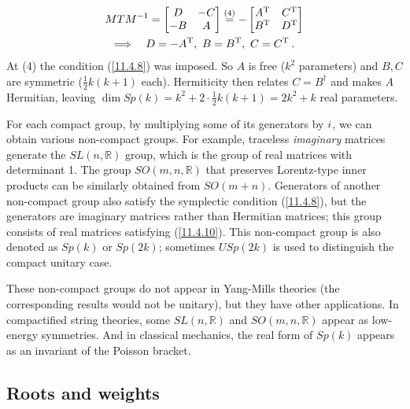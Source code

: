 \begin{itemize}
\begin{tcolorbox}[breakable]
\begin{remark}
\begin{gather*}
				MTM^{-1}=\begin{bmatrix}D&-C\\-B&A\end{bmatrix}\eqs{4}-\begin{bmatrix}A^{\mathrm{T}}&C^{\mathrm{T}}\\B^{\mathrm{T}}&D^{\mathrm{T}}\end{bmatrix}\\
				\Longrightarrow\quad D=-A^{\mathrm{T}},\ B=B^{\mathrm{T}},\ C=C^{\mathrm{T}}\:.
			\end{gather*}
			At (4) the condition (\ref{11.4.8}) was imposed. So $A$ is free ($k^{2}$ parameters) and $B,C$ are symmetric ($\frac{1}{2}k(k+1)$ each). Hermiticity then relates $C=B^{\dagger}$ and makes $A$ Hermitian, leaving $\operatorname{dim}Sp(k)=k^{2}+2\cdot\frac{1}{2}k(k+1)=2k^{2}+k$ real parameters.
		\end{remark}
	\end{tcolorbox}
\end{itemize}

For each compact group, by multiplying some of its generators by $i$, we can obtain various non-compact groups. For example, traceless \emph{imaginary} matrices generate the $SL(n,\mathds{R})$ group, which is the group of real matrices with determinant 1. The group $SO(m,n,\mathds{R})$ that preserves Lorentz-type inner products can be similarly obtained from $SO(m+n)$. Generators of another non-compact group also satisfy the symplectic condition (\ref{11.4.8}), but the generators are imaginary matrices rather than Hermitian matrices; this group consists of real matrices satisfying (\ref{11.4.10}). This non-compact group is also denoted as $Sp(k)$ or $Sp(2k)$; sometimes $USp(2k)$ is used to distinguish the compact unitary case.

These non-compact groups do not appear in Yang-Mills theories (the corresponding results would not be unitary), but they have other applications. In compactified string theories, some $SL(n,\mathds{R})$ and $SO(m,n,\mathds{R})$ appear as low-energy symmetries. And in classical mechanics, the real form of $Sp(k)$ appears as an invariant of the Poisson bracket.

\subsection*{Roots and weights}

